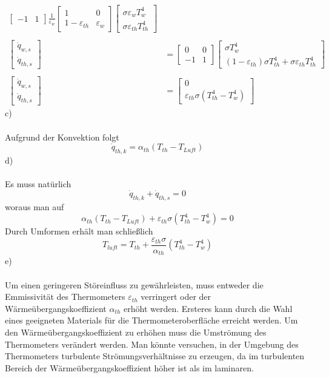 \begin{align*}
\begin{bmatrix}
	-1 & 1
	\end{bmatrix}
	\frac{1}{\varepsilon_w}
	\begin{bmatrix}
		1 & 0 \\
		1 - \varepsilon_{th} & \varepsilon_w
	\end{bmatrix}
	\begin{bmatrix}
		\sigma\varepsilon_wT_w^4 \\
		\sigma\varepsilon_{th}T_{th}^4
	\end{bmatrix} 
	\\ \\
		\begin{bmatrix}
	\dot{q}_{w,s} \\
	\dot{q}_{th,s}
	\end{bmatrix}
	&=
	\begin{bmatrix}
	0 & 0 \\
	-1 & 1
	\end{bmatrix}
	\begin{bmatrix}
		\sigma T_w^4 \\
		(1 - \varepsilon_{th})\sigma T_{th}^4 + \sigma \varepsilon_{th}T_{th}^4
	\end{bmatrix}
	\\ \\
		\begin{bmatrix}
	\dot{q}_{w,s} \\
	\dot{q}_{th,s}
	\end{bmatrix}
	&=
	\begin{bmatrix}
		0 \\
		\varepsilon_{th}\sigma(T_{th}^4 - T_w^4)
	\end{bmatrix}
\end{align*}
c)\\ \\
Aufgrund der Konvektion folgt 
\[
	\dot{q}_{th,k} = \alpha_{th}(T_{th} - T_{Luft})
\]
d)\\ \\
Es muss natürlich 
\[
	\dot{q}_{th,k} + \dot{q}_{th,s} = 0
\]
woraus man auf
\[
	\alpha_{th}(T_{th} - T_{Luft}) + \varepsilon_{th}\sigma(T_{th}^4 - T_w^4) = 0
\]
Durch Umformen erhält man schließlich
\[
	T_{luft} = T_{th} + \frac{\varepsilon_{th}\sigma}{\alpha_{th}}(T_{th}^4 - T_w^4)
\]
e)\\ \\
Um einen geringeren Störeinfluss zu gewährleisten, muss entweder die Emmissivität des Thermometers $\varepsilon_{th}$ verringert oder der Wärmeübergangskoeffizient $\alpha_{th}$ erhöht werden. Ersteres kann durch die Wahl eines geeigneten Materials für die Thermometeroberfläche erreicht werden. Um den Wärmeübergangskoeffizient zu erhöhen muss die Umströmung des Thermometers verändert werden. Man könnte versuchen, in der Umgebung des Thermometers turbulente Strömungsverhältnisse zu erzeugen, da im turbulenten Bereich der Wärmeübergangskoeffizient höher ist als im laminaren.